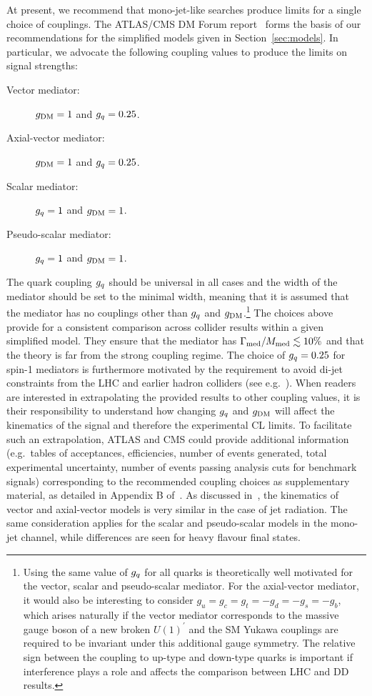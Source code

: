\label{sub:couplingsandscaling}

At present, we recommend that mono-jet-like searches produce limits for a single choice of couplings. The ATLAS/CMS DM Forum report~\cite{Abercrombie:2015wmb} forms the basis of our recommendations for the simplified models given in Section~\ref{sec:models}. In particular, we advocate the following coupling values to produce the limits on signal strengths:
\begin{description}
\item[Vector mediator:] $g_{\rm{DM}}=1$ and $g_q=0.25$.
\item[Axial-vector mediator:] $g_{\rm{DM}}=1$ and $g_q=0.25$.
\item[Scalar mediator:] $g_q=1$ and $g_{\rm{DM}}=1$.
\item[Pseudo-scalar mediator:] $g_q=1$ and $g_{\rm{DM}}=1$.
\end{description}
The quark coupling $g_q$ should be universal in all cases and the width of the mediator should be set to the minimal width, meaning that it is assumed that the mediator has no couplings other than $g_q$ and $g_{\rm{DM}}$.\footnote{Using the same value of $g_q$ for all quarks is theoretically well motivated for the vector, scalar and pseudo-scalar mediator. For the axial-vector mediator, it would also be interesting to consider $g_u = g_c = g_t = - g_d = -g_s = -g_b$, which arises naturally if the vector mediator corresponds to the massive gauge boson of a new broken $U(1)^\prime$ and the SM Yukawa couplings are required to be invariant under this additional gauge symmetry. The relative sign between the coupling to up-type 
and down-type quarks is important if interference plays a role and affects the comparison between LHC and  DD results.} The choices above provide for a consistent comparison across collider results within a given simplified model. They ensure that the mediator has $\Gamma_{\rm med}/M_{\rm med} \lesssim 10\%$ and that the theory is far from the strong coupling regime. The choice of $g_q=0.25$ for spin-1 mediators is furthermore motivated by the requirement to avoid di-jet constraints from the LHC and earlier hadron colliders (see e.g.~\cite{Chala:2015ama}). When readers are interested in extrapolating the provided results to other coupling values, it is their responsibility to understand how changing $g_q$ and $g_{\rm{DM}}$ will affect the kinematics of the signal and therefore the experimental CL limits. To facilitate such an extrapolation, ATLAS and CMS could provide additional information (e.g.~tables of acceptances, efficiencies, number of events generated, total experimental uncertainty, number of events passing analysis cuts for benchmark signals)
corresponding to the recommended coupling choices as supplementary material, as detailed in Appendix B of~\cite{Abercrombie:2015wmb}. 
As discussed in~\cite{Abercrombie:2015wmb}, the kinematics of vector and axial-vector models is very similar in the case of jet radiation. The same consideration applies for the scalar and pseudo-scalar models in the mono-jet channel, while differences are seen for heavy flavour final states. 


